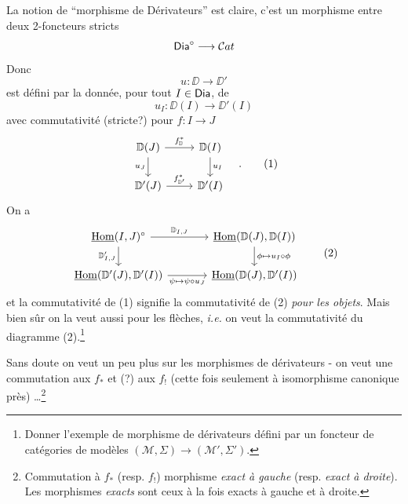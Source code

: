 \noindent{}La notion de “morphisme de Dérivateurs” est claire, c’est un morphisme entre deux 2-foncteurs stricts
\[
\mathsf{Dia}^\circ \longrightarrow \mathcal{C}at
\]
Donc
\[
u : \DD \longrightarrow \DD'
\]
est défini par la donnée, pour tout $I \in \mathsf{Dia}$, de
\[
u_I : \DD(I) \longrightarrow \DD'(I)
\]
avec commutativité (stricte?) pour $f : I \to J$
\[
\begin{tikzcd}
\DD(J) \arrow[r, "f^*_{\DD}"] \arrow[d, "u_J"'] & \DD(I) \arrow[d, "u_I"] \\
\DD'(J) \arrow[r, "f^*_{\DD'}"] & \DD'(I)
\end{tikzcd}
\quad . \tag*{(1)}
\]
On a
\[
\begin{tikzcd}[column sep=large]
\uHom(I,J)^\circ \arrow[r, "\DD_{I,J}"] \arrow[d, "\DD'_{I,J}"'] & \uHom(\DD(J),\DD(I)) \arrow[d, "\phi \mapsto u_I \circ \phi"] \\
\uHom(\DD'(J),\DD'(I)) \arrow[r, "\psi \mapsto \psi \circ u_J"'] & \uHom(\DD(J),\DD'(I))
\end{tikzcd}
\tag*{(2)}
\]
et la commutativité de (1) signifie la commutativité de (2) \textit{pour les objets}. Mais bien sûr on la veut aussi pour les flèches, \textit{i.e.} on veut la commutativité du diagramme (2).\footnote[5]{Donner l’exemple de morphisme de dérivateurs défini par un foncteur de catégories de modèles $(\mathcal{M},\Sigma) \to (\mathcal{M}',\Sigma')$.}

Sans doute on veut un peu plus sur les morphismes de dérivateurs - on veut une commutation aux $f_*$ et (?) aux $f_!$ (cette fois seulement à isomorphisme canonique près) \ldots\footnote[6]{Commutation à $f_*$ (resp. $f_!$) morphisme \textit{exact à gauche} (resp. \textit{exact à droite}). Les morphismes \textit{exacts} sont ceux à la fois exacts à gauche et à droite.}

